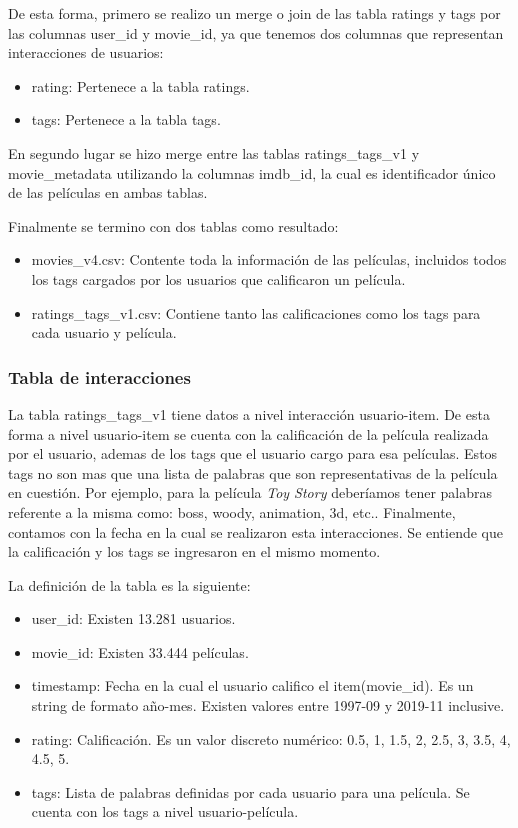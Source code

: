 \documentclass[11pt,a4paper,twoside]{thesis}
\begin{document}
De esta forma, primero se realizo un merge o join de las tabla ratings y tags por las columnas user\_id y movie\_id,
 ya que tenemos dos columnas que representan interacciones de usuarios: 

\begin{itemize}
	\item rating: Pertenece a la tabla ratings.
	\item tags: Pertenece a la tabla tags.
\end{itemize}

En segundo lugar se hizo merge entre las tablas ratings\_tags\_v1 y movie\_metadata utilizando la columnas imdb\_id, la cual es identificador único de las películas en ambas tablas.

Finalmente se termino con dos tablas como resultado:

\begin{itemize}
	\item movies\_v4.csv: Contente toda la información de las películas, incluidos todos los tags cargados por los usuarios que calificaron un película.
	\item ratings\_tags\_v1.csv: Contiene tanto las calificaciones como los tags para cada usuario y película. 
\end{itemize}

\subsubsection{Tabla de interacciones}

La tabla ratings\_tags\_v1 tiene datos a nivel interacción usuario-item. De esta forma a nivel usuario-item se cuenta con la calificación de la película realizada por el usuario, ademas de los tags que el usuario cargo para esa películas. Estos tags no son mas que una lista de palabras que son representativas de la película en cuestión. 
Por ejemplo, para la película \textit{Toy Story} deberíamos tener palabras referente a la misma como: boss, woody, 
animation, 3d, etc.. Finalmente, contamos con la fecha en la cual se realizaron esta interacciones. Se entiende 
que la calificación y los tags se ingresaron en el mismo momento.


La definición de la tabla es la siguiente:

\begin{itemize}
	\item user\_id:  Existen 13.281 usuarios.
	\item movie\_id: Existen 33.444 películas.
	\item timestamp: Fecha en la cual el usuario califico el item(movie\_id). Es un string de formato año-mes. Existen valores entre 1997-09 y 2019-11 inclusive.
	\item rating:    Calificación. Es un valor discreto numérico: 0.5, 1, 1.5, 2, 2.5, 3, 3.5, 4, 4.5, 5.
	\item tags:      Lista de palabras definidas por cada usuario para una película. Se cuenta con los tags a nivel usuario-película.
\end{itemize}
\end{document}
